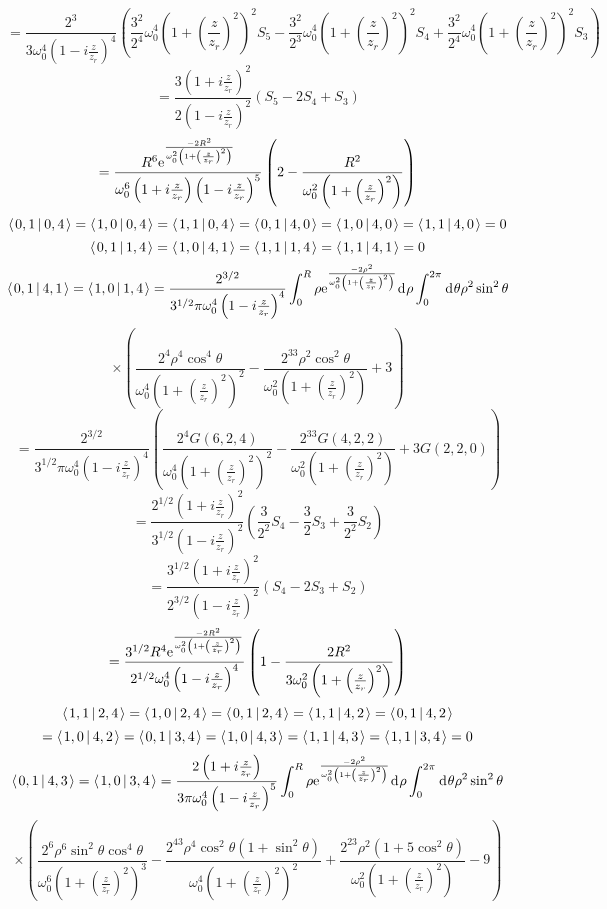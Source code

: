 \documentclass[11pt]{amsart}
\makeatletter
\newcommand{\e}{{\rm e}}				%
\newcommand{\msp}[1]{\mspace{#1mu}}		%
\newcommand{\0}{\varnothing}		%
\newcommand{\dd}{\msp{1} {\rm{d}} \msp{1}}	%
\newcommand{\brac}[2]{\left\langle\msp{2} #1\left\lvert \msp{3.5} #2 \right.\right\rangle}	%
\newcommand{\1}{!}
\newcommand{\2}{@}
\newcommand{\3}{\#}
\newcommand{\4}{\$}
\newcommand{\5}{\%}
\newcommand{\6}{$^\wedge$}
\newcommand{\7}{\&}
\newcommand{\8}{*}
\newcommand{\9}{(}
\makeatother
\begin{document}
\[
=\frac{2^3}{3\omega_0^4\left(1-i\frac{z}{z_r}\right)^4}\left(\frac{3^2}{2^4}\omega_0^4\left(1+\left(\frac{z}{z_r}\right)^2\right)^2S_5-\frac{3^2}{2^3}\omega_0^4\left(1+\left(\frac{z}{z_r}\right)^2\right)^2S_4+\frac{3^2}{2^4}\omega_0^4\left(1+\left(\frac{z}{z_r}\right)^2\right)^2S_3\right)
\]
\[
=\frac{3\left(1+i\frac{z}{z_r}\right)^2}{2\left(1-i\frac{z}{z_r}\right)^2}\left(S_5-2S_4+S_3\right)
\]
\[
=\frac{R^6\e^{\frac{-2R^2}{\omega_0^2\left(1+\left(\frac{z}{z_r}\right)^2\right)}}}{\omega_0^6\left(1+i\frac{z}{z_r}\right)\left(1-i\frac{z}{z_r}\right)^5}\left(2-\frac{R^2}{\omega_0^2\left(1+\left(\frac{z}{z_r}\right)^2\right)}\right)
\]
\[
\brac{0,1}{0,4} = \brac{1,0}{0,4} = \brac{1,1}{0,4} = \brac{0,1}{4,0} = \brac{1,0}{4,0} = \brac{1,1}{4,0} = 0
\]
\[
\brac{0,1}{1,4} = \brac{1,0}{4,1} = \brac{1,1}{1,4} = \brac{1,1}{4,1} = 0
\]
\[
\brac{0,1}{4,1} = \brac{1,0}{1,4} = \frac{2^{3/2}}{3^{1/2}\pi\omega_0^4\left(1-i\frac{z}{z_r}\right)^4}\int_0^R\rho \e^{\frac{-2\rho^2}{\omega_0^2\left(1+\left(\frac{z}{z_r}\right)^2\right)}}\dd \rho\int_0^{2\pi} \dd \theta \rho^2\sin^2\theta
\]
\[
\times\left(\frac{2^4\rho^4\cos^4\theta}{\omega_0^4\left(1+\left(\frac{z}{z_r}\right)^2\right)^2}-\frac{2^33\rho^2\cos^2\theta}{\omega_0^2\left(1+\left(\frac{z}{z_r}\right)^2\right)}+3\right)
\]
\[
=\frac{2^{3/2}}{3^{1/2}\pi \omega_0^4\left(1-i\frac{z}{z_r}\right)^4}\left(\frac{2^4G(6,2,4)}{\omega_0^4\left(1+\left(\frac{z}{z_r}\right)^2\right)^2}-\frac{2^33G(4,2,2)}{\omega_0^2\left(1+\left(\frac{z}{z_r}\right)^2\right)}+3G(2,2,0)\right)
\]
\[
=\frac{2^{1/2}\left(1+i\frac{z}{z_r}\right)^2}{3^{1/2}\left(1-i\frac{z}{z_r}\right)^2}\left(\frac{3}{2^2}S_4-\frac{3}{2}S_3+\frac{3}{2^2}S_2\right)
\]
\[
=\frac{3^{1/2}\left(1+i\frac{z}{z_r}\right)^2}{2^{3/2}\left(1-i\frac{z}{z_r}\right)^2}\left(S_4-2S_3+S_2\right)
\]
\[
=\frac{3^{1/2}R^4\e^{\frac{-2R^2}{\omega_0^2\left(1+\left(\frac{z}{z_r}\right)^2\right)}}}{2^{1/2}\omega_0^4\left(1-i\frac{z}{z_r}\right)^4}\left(1-\frac{2R^2}{3\omega_0^2\left(1+\left(\frac{z}{z_r}\right)^2\right)}\right)
\]
\[
\brac{1,1}{2,4} = \brac{1,0}{2,4} = \brac{0,1}{2,4} = \brac{1,1}{4,2} = \brac{0,1}{4,2} 
\]
\[
= \brac{1,0}{4,2} = \brac{0,1}{3,4} = \brac{1,0}{4,3} = \brac{1,1}{4,3} = \brac{1,1}{3,4} = 0
\]
\[
\brac{0,1}{4,3} = \brac{1,0}{3,4} = \frac{2\left(1+i\frac{z}{z_r}\right)}{3\pi\omega_0^4\left(1-i\frac{z}{z_r}\right)^5}\int_0^R\rho \e^{\frac{-2\rho^2}{\omega_0^2\left(1+\left(\frac{z}{z_r}\right)^2\right)}}\dd \rho\int_0^{2\pi} \dd\theta \rho^2 \sin^2\theta
\]
\[
\times\left(\frac{2^6\rho^6\sin^2\theta\cos^4\theta}{\omega_0^6\left(1+\left(\frac{z}{z_r}\right)^2\right)^3}-\frac{2^43\rho^4\cos^2\theta\left(1+\sin^2\theta\right)}{\omega_0^4\left(1+\left(\frac{z}{z_r}\right)^2\right)^2}+\frac{2^23\rho^2\left(1+5\cos^2\theta\right)}{\omega_0^2\left(1+\left(\frac{z}{z_r}\right)^2\right)}-9\right)
\]
\end{document}
